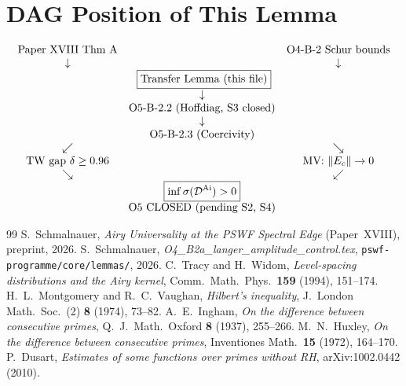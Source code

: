 \documentclass[12pt,a4paper]{amsart}
\theoremstyle{definition}
\newcommand{\norm}[1]{\|#1\|}
\begin{document}
\section{DAG Position of This Lemma}
\label{sec:dag}

\[
\begin{array}{ccccc}
\text{Paper XVIII Thm A} & & \text{O4-B-2 Schur bounds} \\
\downarrow & & \downarrow \\
\multicolumn{3}{c}{\boxed{\text{Transfer Lemma (this file)}}} \\
& \downarrow & \\
& \text{O5-B-2.2 (Hoffdiag, S3 closed)} & \\
& \downarrow & \\
& \text{O5-B-2.3 (Coercivity)} & \\
\swarrow & & \searrow \\
\text{TW gap } \delta \ge 0.96 & & \text{MV: } \norm{E_c} \to 0 \\
\searrow & & \swarrow \\
& \boxed{\inf\sigma(\mathcal{D}^{\mathrm{Ai}}) > 0} & \\
& \text{O5 CLOSED (pending S2, S4)} &
\end{array}
\]

\begin{thebibliography}{99}
S.~Schmalnauer,
\textit{Airy Universality at the PSWF Spectral Edge} (Paper~XVIII),
preprint, 2026.
S.~Schmalnauer,
\textit{O4\_B2a\_langer\_amplitude\_control.tex},
\texttt{pswf-programme/core/lemmas/}, 2026.
C.~Tracy and H.~Widom,
\textit{Level-spacing distributions and the Airy kernel},
Comm.\ Math.\ Phys.\ \textbf{159} (1994), 151--174.
H.~L.~Montgomery and R.~C.~Vaughan,
\textit{Hilbert's inequality},
J.\ London Math.\ Soc.\ (2) \textbf{8} (1974), 73--82.
A.~E.~Ingham,
\textit{On the difference between consecutive primes},
Q.\ J.\ Math.\ Oxford \textbf{8} (1937), 255--266.
M.~N.~Huxley,
\textit{On the difference between consecutive primes},
Inventiones Math.\ \textbf{15} (1972), 164--170.
P.~Dusart,
\textit{Estimates of some functions over primes without RH},
arXiv:1002.0442 (2010).
\end{thebibliography}
\end{document}
